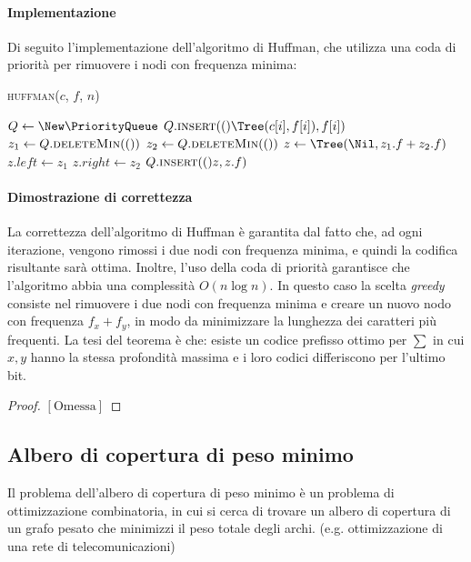             \paragraph{Implementazione}
                Di seguito l'implementazione dell'algoritmo di Huffman, che utilizza una coda di priorità per rimuovere i nodi con frequenza minima:
                \begin{algorithm}[H]
                    \caption{\Tree \textsc{huffman}(\Int[] $c$, \Int[] $f$, \Int $n$)}
                    \begin{algorithmic}
                        \State \PriorityQueue $Q \gets \New \PriorityQueue$ 
                            \State $Q.\Call{insert}(\Tree(c[i], f[i]), f[i])$
                        \EndFor
                            \State $z_1 \gets Q.\Call{deleteMin}()$
                            \State $z_2 \gets Q.\Call{deleteMin}()$
                            \State $z \gets \Tree(\Nil, z_1.f + z_2.f)$ 
                            \State $z.left \gets z_1$
                            \State $z.right \gets z_2$
                            \State $Q.\Call{insert}(z, z.f)$
                        \EndFor
                    \end{algorithmic}
                \end{algorithm}
            \paragraph{Dimostrazione di correttezza} 
                La correttezza dell'algoritmo di Huffman è garantita dal fatto che, ad ogni iterazione, vengono rimossi i due nodi con frequenza minima, e quindi la codifica risultante sarà ottima. Inoltre, l'uso della coda di priorità garantisce che l'algoritmo abbia una complessità $O(n \log n)$. In questo caso la scelta \textit{greedy} consiste nel rimuovere i due nodi con frequenza minima e creare un nuovo nodo con frequenza $f_x + f_y$, in modo da minimizzare la lunghezza dei caratteri più frequenti. La tesi del teorema è che: esiste un codice prefisso ottimo per $\sum$ in cui $x,y$ hanno la stessa profondità massima e i loro codici differiscono per l'ultimo bit.
                \begin{proof}
                    $[\text{Omessa}]$
                \end{proof}
    \subsection{Albero di copertura di peso minimo}
        Il problema dell'albero di copertura di peso minimo è un problema di ottimizzazione combinatoria, in cui si cerca di trovare un albero di copertura di un grafo pesato che minimizzi il peso totale degli archi. (e.g. ottimizzazione di una rete di telecomunicazioni)
